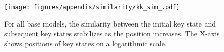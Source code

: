 \begin{figure}[ht]
    \centering
    \texttt{[image: figures/appendix/similarity/kk\_sim\_.pdf]}
    \caption{For all base models, the similarity between the initial key state and subsequent key states stabilizes as the position increases. The X-axis shows positions of key states on a logarithmic scale.} 
    \label{fig:app:sim:kk}
\end{figure}